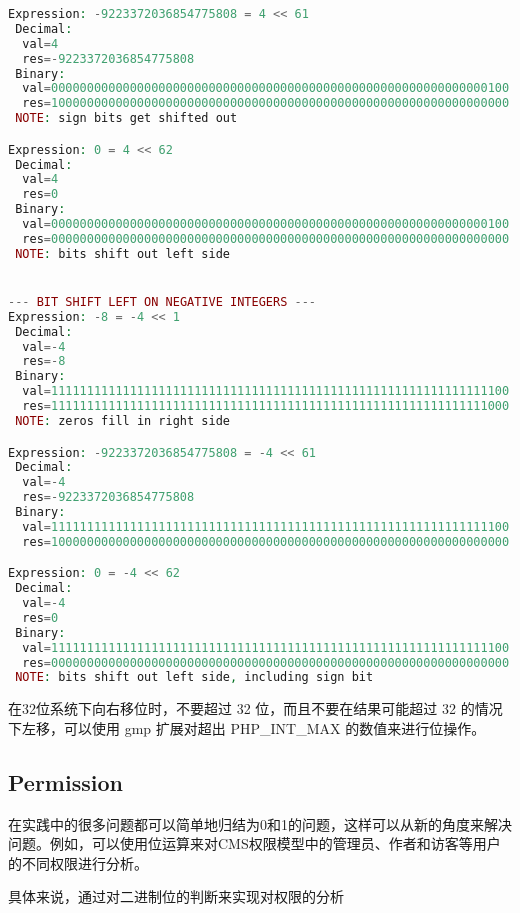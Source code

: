 \begin{lstlisting}[language=PHP]
Expression: -9223372036854775808 = 4 << 61
 Decimal:
  val=4
  res=-9223372036854775808
 Binary:
  val=0000000000000000000000000000000000000000000000000000000000000100
  res=1000000000000000000000000000000000000000000000000000000000000000
 NOTE: sign bits get shifted out

Expression: 0 = 4 << 62
 Decimal:
  val=4
  res=0
 Binary:
  val=0000000000000000000000000000000000000000000000000000000000000100
  res=0000000000000000000000000000000000000000000000000000000000000000
 NOTE: bits shift out left side


--- BIT SHIFT LEFT ON NEGATIVE INTEGERS ---
Expression: -8 = -4 << 1
 Decimal:
  val=-4
  res=-8
 Binary:
  val=1111111111111111111111111111111111111111111111111111111111111100
  res=1111111111111111111111111111111111111111111111111111111111111000
 NOTE: zeros fill in right side

Expression: -9223372036854775808 = -4 << 61
 Decimal:
  val=-4
  res=-9223372036854775808
 Binary:
  val=1111111111111111111111111111111111111111111111111111111111111100
  res=1000000000000000000000000000000000000000000000000000000000000000

Expression: 0 = -4 << 62
 Decimal:
  val=-4
  res=0
 Binary:
  val=1111111111111111111111111111111111111111111111111111111111111100
  res=0000000000000000000000000000000000000000000000000000000000000000
 NOTE: bits shift out left side, including sign bit
\end{lstlisting}



在32位系统下向右移位时，不要超过 32 位，而且不要在结果可能超过 32 的情况下左移，可以使用 gmp 扩展对超出 PHP\_INT\_MAX 的数值来进行位操作。

\subsection{Permission}


在实践中的很多问题都可以简单地归结为0和1的问题，这样可以从新的角度来解决问题。例如，可以使用位运算来对CMS权限模型中的管理员、作者和访客等用户的不同权限进行分析。

具体来说，通过对二进制位的判断来实现对权限的分析

